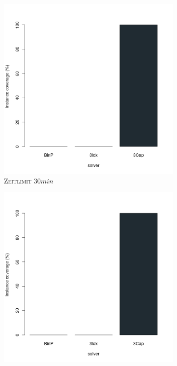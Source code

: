 \begin{figure}[H]
\centering

\begin{subfigure}[b]{0.3\textwidth}
\centering
\includegraphics[width=1.2\textwidth]{img/solver_instance_coverage_b=3_l_1800s.png}
\caption{\textsc{Zeitlimit} $30min$}
\label{fig:instance_coverage_b=3_l_a}
\end{subfigure}
\hfill
\begin{subfigure}[b]{0.3\textwidth}
\centering
\includegraphics[width=1.2\textwidth]{img/solver_instance_coverage_b=3_l_2700s.png}

\end{subfigure}
\end{figure}
